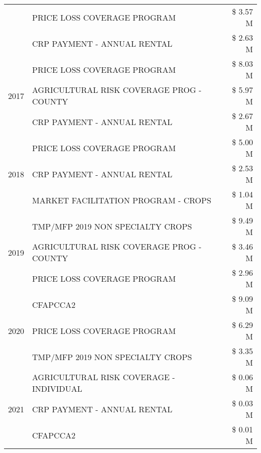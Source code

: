 \begin{tabular}{llr}
 & PRICE LOSS COVERAGE PROGRAM & \$ 3.57 M \\
 & CRP PAYMENT - ANNUAL RENTAL & \$ 2.63 M \\
\cline{1-3}
\multirow[t]{3}{*}{2017} & PRICE LOSS COVERAGE PROGRAM & \$ 8.03 M \\
 & AGRICULTURAL RISK COVERAGE PROG - COUNTY & \$ 5.97 M \\
 & CRP PAYMENT - ANNUAL RENTAL & \$ 2.67 M \\
\cline{1-3}
\multirow[t]{3}{*}{2018} & PRICE LOSS COVERAGE PROGRAM & \$ 5.00 M \\
 & CRP PAYMENT - ANNUAL RENTAL & \$ 2.53 M \\
 & MARKET FACILITATION PROGRAM - CROPS & \$ 1.04 M \\
\cline{1-3}
\multirow[t]{3}{*}{2019} & TMP/MFP 2019 NON SPECIALTY CROPS & \$ 9.49 M \\
 & AGRICULTURAL RISK COVERAGE PROG - COUNTY & \$ 3.46 M \\
 & PRICE LOSS COVERAGE PROGRAM & \$ 2.96 M \\
\cline{1-3}
\multirow[t]{3}{*}{2020} & CFAPCCA2 & \$ 9.09 M \\
 & PRICE LOSS COVERAGE PROGRAM & \$ 6.29 M \\
 & TMP/MFP 2019 NON SPECIALTY CROPS & \$ 3.35 M \\
\cline{1-3}
\multirow[t]{3}{*}{2021} & AGRICULTURAL RISK COVERAGE - INDIVIDUAL & \$ 0.06 M \\
 & CRP PAYMENT - ANNUAL RENTAL & \$ 0.03 M \\
 & CFAPCCA2 & \$ 0.01 M \\
\cline{1-3}
\bottomrule
\end{tabular}
